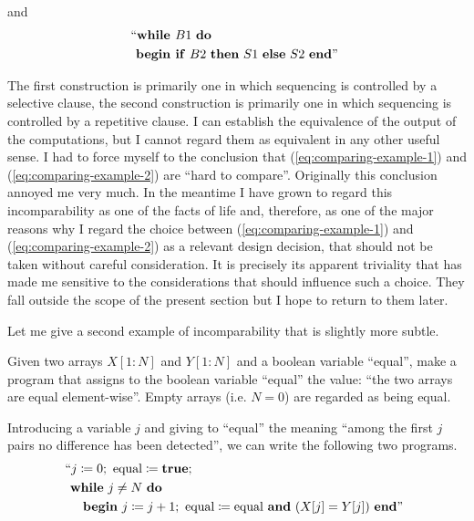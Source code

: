 \noindent
and
\begin{equation}
	\label{eq:comparing-example-2}
	\begin{split}
		&\text{\hspace{-.4em}``\textbf{while }} B1\text{ \textbf{do}}\\
		&\text{\textbf{begin if} } B2\text{ \textbf{then} } S1\text{ \textbf{else} } S2\text{ \textbf{end}''}
	\end{split}
\end{equation}

\label{pg:dilema}
The first construction is primarily one in which sequencing is controlled by a selective clause, the second construction is primarily one in which sequencing is controlled by a repetitive clause. I can establish the equivalence of the output of the computations, but I cannot regard them as equivalent in any other useful sense. I had to force myself to the conclusion that (\ref{eq:comparing-example-1}) and (\ref{eq:comparing-example-2}) are ``hard to compare''. Originally this conclusion annoyed me very much. In the meantime I have grown to regard this incomparability as one of the facts of life and, therefore, as one of the major reasons why I regard the choice between (\ref{eq:comparing-example-1}) and (\ref{eq:comparing-example-2}) as a relevant design decision, that should not be taken without careful consideration. It is precisely its apparent triviality that has made me sensitive to the considerations that should influence such a choice. They fall outside the scope of the present section but I hope to return to them later.

Let me give a second example of incomparability that is slightly more subtle.

Given two arrays $X[1:N]$ and $Y[1:N]$ and a boolean variable ``equal'', make a program that assigns to the boolean variable ``equal'' the value: ``the two arrays are equal element-wise''. Empty arrays (i.e. $N = 0$) are regarded as being equal.

Introducing a variable $j$ and giving to ``equal'' the meaning ``among the first $j$ pairs no difference has been detected'', we can write the following two programs.
\begin{equation}
	\label{eq:comparing-example-3}
	\begin{split}
		&\text{\hspace{-.4em}``}j \coloneq 0;\text{ equal} \coloneq \text{\textbf{true}};\\
		&\text{\textbf{while} } j \neq N\text{ \textbf{do}}\\
		&\quad\text{\textbf{begin} } j \coloneq  j + 1;\text{ equal} \coloneq \text{equal \textbf{and} } (X[j] = Y[j]) \text{ \textbf{end}''}
	\end{split}
\end{equation}

